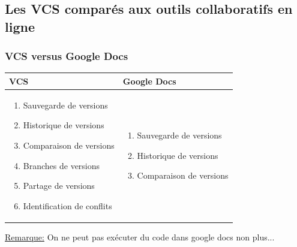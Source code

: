 \documentclass{beamer}
\begin{document}
\subsection{Les VCS comparés aux outils collaboratifs en ligne}
\begin{frame}
\frametitle{VCS versus Google Docs}
\begin{tabular}{ | m{12em} | m{12em} | }
    \hline
    
    \textbf{VCS} & \textbf{Google Docs}\\
        
    \hline
    
    \begin{enumerate}
    \item Sauvegarde de versions
    \item Historique de versions 
    \item Comparaison de versions
    \item Branches de versions
    \item Partage de versions
    \item Identification de conflits
    \end{enumerate}
    
    & 
    
    \begin{enumerate}
    \item Sauvegarde de versions
    \item Historique de versions
    \item Comparaison de versions
    \end{enumerate} \\
    
    \hline
\end{tabular}
\medskip

\underline{Remarque:} On ne peut pas exécuter du code dans google docs non plus...
\end{frame}

\end{document}
